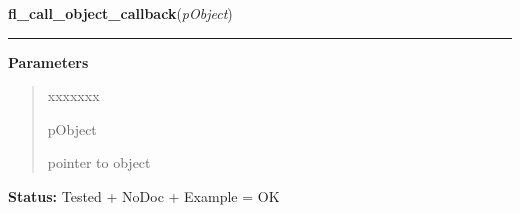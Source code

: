 \hspace{.8\funcindent}\begin{boxedminipage}{\funcwidth}

    \raggedright \textbf{fl\_call\_object\_callback}(\textit{pObject})

    \vspace{-1.5ex}

    \rule{\textwidth}{0.5\fboxrule}
\setlength{\parskip}{2ex}
\setlength{\parskip}{1ex}
      \textbf{Parameters}
      \vspace{-1ex}

      \begin{quote}
        \begin{Ventry}{xxxxxxx}

          \item[pObject]

          pointer to object

        \end{Ventry}

      \end{quote}

\textbf{Status:} Tested + NoDoc + Example = OK



    \end{boxedminipage}

    \label{xformslib:library:fl_set_object_prehandler}

    \vspace{0.5ex}


